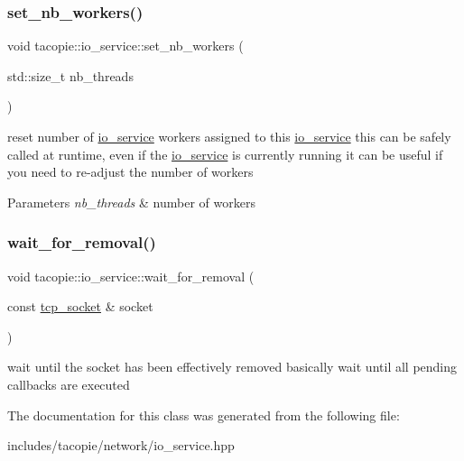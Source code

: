 \subsubsection{\texorpdfstring{set\+\_\+nb\+\_\+workers()}{set\_nb\_workers()}}
{\footnotesize\ttfamily void tacopie\+::io\+\_\+service\+::set\+\_\+nb\+\_\+workers (\begin{DoxyParamCaption}\item[{std\+::size\+\_\+t}]{nb\+\_\+threads }\end{DoxyParamCaption})}

reset number of \hyperlink{classtacopie_1_1io__service}{io\+\_\+service} workers assigned to this \hyperlink{classtacopie_1_1io__service}{io\+\_\+service} this can be safely called at runtime, even if the \hyperlink{classtacopie_1_1io__service}{io\+\_\+service} is currently running it can be useful if you need to re-\/adjust the number of workers


\begin{DoxyParams}{Parameters}
{\em nb\+\_\+threads} & number of workers \\
\hline
\end{DoxyParams}
\mbox{\label{classtacopie_1_1io__service_aa57db619baeaa6db0aeb22e67b895cd7}} 
\subsubsection{\texorpdfstring{wait\+\_\+for\+\_\+removal()}{wait\_for\_removal()}}
{\footnotesize\ttfamily void tacopie\+::io\+\_\+service\+::wait\+\_\+for\+\_\+removal (\begin{DoxyParamCaption}\item[{const \hyperlink{classtacopie_1_1tcp__socket}{tcp\+\_\+socket} \&}]{socket }\end{DoxyParamCaption})}

wait until the socket has been effectively removed basically wait until all pending callbacks are executed 

The documentation for this class was generated from the following file\+:\begin{DoxyCompactItemize}
\item 
includes/tacopie/network/io\+\_\+service.\+hpp\end{DoxyCompactItemize}
